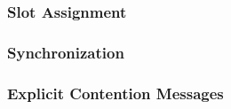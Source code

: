 \subsubsection{Slot Assignment}
\subsubsection{Synchronization}
\subsubsection{Explicit Contention Messages}
